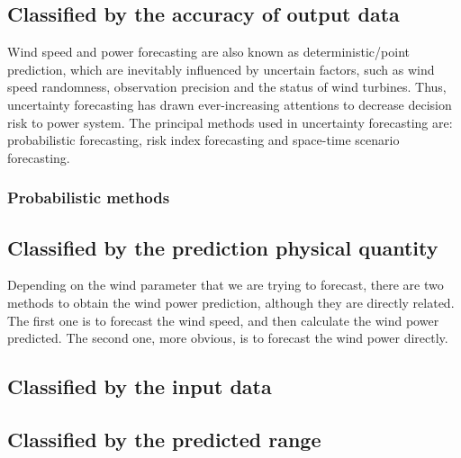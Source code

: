 \subsection{Classified by the accuracy of output data}

Wind speed and power forecasting are also known as deterministic/point prediction, which are inevitably influenced by uncertain factors, such as wind speed randomness, observation precision and the status of wind turbines. Thus, uncertainty forecasting has drawn ever-increasing attentions to decrease decision risk to power system. The principal methods used in uncertainty forecasting are: probabilistic forecasting, risk index forecasting and space-time scenario forecasting.

\subsubsection{Probabilistic methods}



\subsection{Classified by the prediction physical quantity}

Depending on the wind parameter that we are trying to forecast, there are two methods to obtain the wind power prediction, although they are directly related. The first one is to forecast the wind speed, and then calculate the wind power predicted. The second one, more obvious, is to forecast the wind power directly.

\subsection{Classified by the input data}

\subsection{Classified by the predicted range}
